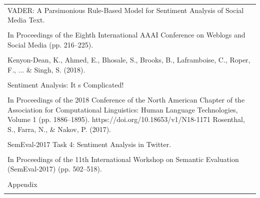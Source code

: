 \documentclass[11pt]{article}
\begin{document}
\begin{longtable}{|p{\dimexpr\linewidth-2\tabcolsep-2\arrayrulewidth\relax}|}
\hline
\rule{0pt}{3.5cm} \\
\hline
VADER: A Parsimonious Rule-Based Model for Sentiment Analysis of Social Media Text. \\[2pt]
\hline
\rule{0pt}{3.5cm} \\
\hline
In Proceedings of the Eighth International AAAI Conference on Weblogs and Social Media (pp. 216--225). \\[2pt]
\hline
\rule{0pt}{3.5cm} \\
\hline
Kenyon-Dean, K., Ahmed, E., Bhosale, S., Brooks, B., Laframboise, C., Roper, F., ... \& Singh, S. (2018). \\[2pt]
\hline
\rule{0pt}{3.5cm} \\
\hline
Sentiment Analysis: It s Complicated! \\[2pt]
\hline
\rule{0pt}{3.5cm} \\
\hline
In Proceedings of the 2018 Conference of the North American Chapter of the Association for Computational Linguistics: Human Language Technologies, Volume 1 (pp. 1886--1895). https://doi.org/10.18653/v1/N18-1171 Rosenthal, S., Farra, N., \& Nakov, P. (2017). \\[2pt]
\hline
\rule{0pt}{3.5cm} \\
\hline
SemEval-2017 Task 4: Sentiment Analysis in Twitter. \\[2pt]
\hline
\rule{0pt}{3.5cm} \\
\hline
In Proceedings of the 11th International Workshop on Semantic Evaluation (SemEval-2017) (pp. 502--518). \\[2pt]
\hline
\rule{0pt}{3.5cm} \\
\hline
Appendix \\[2pt]
\hline
\rule{0pt}{3.5cm} \\
\hline
\end{longtable}
\end{document}
